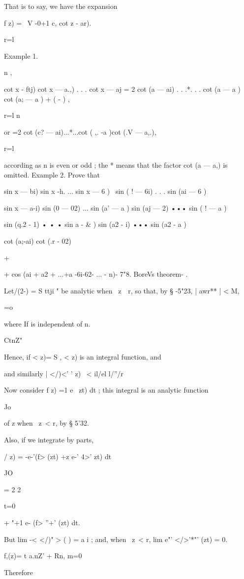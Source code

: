 {That is to say, we have the expansion

f z) = \ V -0+1 c, cot z - ar).

  r=l

Example 1.

n ,

cot x - ftj) cot x — a.,) . . . cot x — aj = 2 cot (a — ai) . . .*. .
. cot (a — a ) cot (a; — a ) + ( - ) ,

r=l n

or =2 cot (c? — ai)...*...cot ( ,. -a )cot (.V — a,.),

r=l

according as n is even or odd ; the * means that the factor cot (a —
a,) is omitted. Example 2. Prove that

sin x — bi) sin x -h. ... sin x — 6 ) \ sin ( ! — 6i) . . . sin (ai —
6 )

sin x — a-i) sin (0 — 02) ... sin (a' — a ) sin (aj — 2) ••• sin ( ! —
a )

sin (q.2 - 1) • • • sin a - \& ) sin (a2 - i) ••• sin (a2 - a )

cot (a;-ai) cot (.r - 02)

+

+ cos (ai + a2 + ...+a -6i-62- ... - n)- 7"8. BoreVs theorem- .

Let/(2-) = S ttji " be analytic when \ z\ \ r, so that, by § -5"23, |
awr** | < M,

 =o

where If is independent of n.

CtnZ"

Hence, if < z)= S , < z) is an integral function, and

and similarly | </)<' ' z) \ < il/el l/''/r

Now consider f z) =1 e~ zt) dt ; this integral is an analytic function

Jo

of z when \ z\ < r, by § 5'32.

Also, if we integrate by parts,

/ z) = -e-'(f> (zt) +z e-' 4>' zt) dt

JO

= 2 2

 t=0

+ "+1 e- (f> ''+' (zt) dt.

But lim -< </)" > ( ) = a i ; and, when \ z\ < r, lim e"' </>'*"' (zt)
= 0.

f,(z)= t a.nZ' + Rn, m=0

Therefore

}
